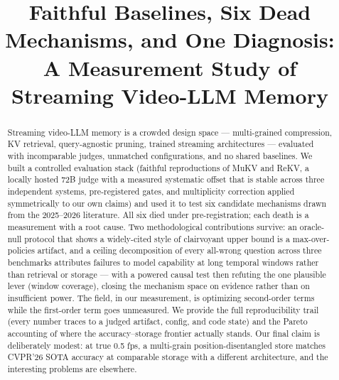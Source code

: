 \documentclass[sigconf,anonymous]{acmart}
\title{Faithful Baselines, Six Dead Mechanisms, and One Diagnosis:\\ A Measurement Study of Streaming Video-LLM Memory}
\begin{document}
\begin{abstract}
Streaming video-LLM memory is a crowded design space — multi-grained compression, KV retrieval, query-agnostic pruning, trained streaming architectures — evaluated with incomparable judges, unmatched configurations, and no shared baselines. We built a controlled evaluation stack (faithful reproductions of MuKV and ReKV, a locally hosted 72B judge with a measured systematic offset that is stable across three independent systems, pre-registered gates, and multiplicity correction applied symmetrically to our own claims) and used it to test six candidate mechanisms drawn from the 2025--2026 literature. All six died under pre-registration; each death is a measurement with a root cause. Two methodological contributions survive: an oracle-null protocol that shows a widely-cited style of clairvoyant upper bound is a max-over-policies artifact, and a ceiling decomposition of every all-wrong question across three benchmarks attributes failures to model capability at long temporal windows rather than retrieval or storage — with a powered causal test then refuting the one plausible lever (window coverage), closing the mechanism space on evidence rather than on insufficient power. The field, in our measurement, is optimizing second-order terms while the first-order term goes unmeasured. We provide the full reproducibility trail (every number traces to a judged artifact, config, and code state) and the Pareto accounting of where the accuracy--storage frontier actually stands. Our final claim is deliberately modest: at true 0.5 fps, a multi-grain position-disentangled store matches CVPR'26 SOTA accuracy at comparable storage with a different architecture, and the interesting problems are elsewhere.
\end{abstract}

\maketitle













\appendix

\end{document}
